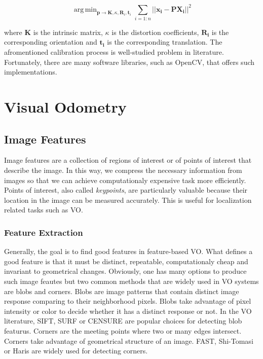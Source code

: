 \documentclass[a4paper]{report}
\numberwithin{figure}{section}
\DeclareMathOperator*{\argmin}{arg\,min}
\begin{document}
\begin{equation}
  \argmin_{\mathbf{p} \rightarrow \mathbf{K}, \kappa, \mathbf{R}_i, \mathbf{t}_i}
  \sum_{i=1:n} || \mathbf{x_{i}} - 
  \mathbf{P} \mathbf{X_{i}} ||^2
\end{equation}

where $\mathbf{K}$ is the intrinsic matrix, 
$\kappa$ is the distortion coefficients, 
$\mathbf{R_i}$ is the corresponding orientation and 
$\mathbf{t_i}$ is the corresponding translation.
The afromentioned calibration process is well-studied problem in literature. 
Fortunately, there are many software libraries, such as OpenCV, 
that offers such implementations.



\chapter{Visual Odometry} \label{cp_vo}

\section{Image Features} \label{sc_img_features}

Image features are a collection of regions of interest or of points of interest 
that describe the image. In this way, we compress the necessary information 
from images so that we can achieve computationaly expensive task more efficiently.
Points of interest, also called \textit{keypoints}, 
are particularly valuable because their location in the image can be 
measured accurately. This is useful for localization related tasks such as VO. 

\subsection{Feature Extraction} \label{sb_sc_feature_extraction}

Generally, the goal is to find good features in feature-based VO. 
What defines a good feature is that it must be distinct, 
repeatable, computationaly cheap and invariant to geometrical changes. 
Obviously, one has many options to produce such image 
feautes but two common methods that are widely used in VO systems are 
blobs and corners. 
Blobs are image patterns that contain distinct image response comparing to their 
neighborhood pixels. Blobs take advantage of pixel intensity or color to 
decide whether it has a distinct response or not.
In the VO literature, SIFT\cite{}, SURF\cite{} or CENSURE\cite{} are popular 
choices for detecting blob featurus.
Corners are the meeting points where two or many edges intersect. Corners 
take advantage of geometrical structure of an image. FAST\cite{}, Shi-Tomasi or 
Haris\cite{} are widely used for detecting corners.
\end{document}
